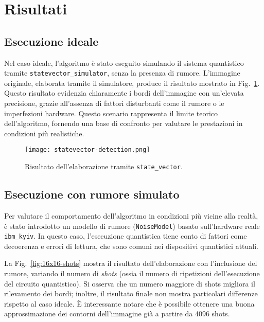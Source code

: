 \section{Risultati}\label{sec:risultati}

\subsection{Esecuzione ideale}

Nel caso ideale, l'algoritmo è stato eseguito
simulando il sistema quantistico tramite \texttt{statevector\_simulator}, 
senza la presenza di rumore. L'immagine originale,
elaborata tramite il simulatore, produce il risultato mostrato in
Fig.~\ref{fig:statevector-detection}. Questo risultato evidenzia chiaramente i bordi
dell'immagine con un'elevata precisione, grazie all'assenza di fattori
disturbanti come il rumore o le imperfezioni hardware. Questo scenario
rappresenta il limite teorico dell'algoritmo, fornendo una base di confronto per
valutare le prestazioni in condizioni più realistiche.

\begin{figure}
	\centering
	\texttt{[image: statevector-detection.png]}
	\caption{Risultato dell'elaborazione tramite \texttt{state\_vector}.}
	\label{fig:statevector-detection}
\end{figure}

\subsection{Esecuzione con rumore simulato}

Per valutare il comportamento dell'algoritmo in condizioni più vicine alla
realtà, è stato introdotto un modello di rumore (\texttt{NoiseModel}) basato
sull'hardware reale \texttt{ibm\_kyiv}. In questo caso, l'esecuzione quantistica
tiene conto di fattori come decoerenza e errori di lettura, che sono comuni nei
dispositivi quantistici attuali.

La Fig.~\ref{fig:16x16-shots} mostra il risultato dell'elaborazione con
l'inclusione del rumore, variando il numero di \textit{shots} (ossia il numero
di ripetizioni dell'esecuzione del circuito quantistico). Si osserva che un
numero maggiore di shots migliora il rilevamento dei bordi; inoltre, il
risultato finale non mostra particolari differenze rispetto al caso ideale. È
interessante notare che è possibile ottenere una buona approssimazione dei
contorni dell'immagine già a partire da 4096 shots.

